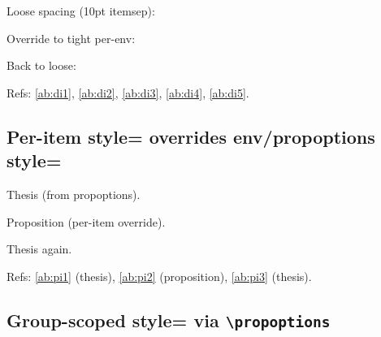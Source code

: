 \documentclass{article}
\begin{document}
Loose spacing (10pt itemsep):
\begin{prop}
  \item \label{ab:di1}
  \item \label{ab:di2}
\end{prop}

Override to tight per-env:
\begin{prop}[itemsep=2pt]
  \item \label{ab:di3}
  \item \label{ab:di4}
\end{prop}

Back to loose:
\begin{prop}
  \item \label{ab:di5}
\end{prop}


Refs: \ref{ab:di1}, \ref{ab:di2}, \ref{ab:di3}, \ref{ab:di4}, \ref{ab:di5}.

\subsection{Per-item style= overrides env/propoptions style=}



\begin{prop}
  \item[Claim G] Thesis (from propoptions). \label{ab:pi1}
  \item[style=proposition, Claim H] Proposition (per-item override). \label{ab:pi2}
  \item[Claim I] Thesis again. \label{ab:pi3}
\end{prop}


Refs: \ref{ab:pi1} (thesis), \ref{ab:pi2} (proposition), \ref{ab:pi3} (thesis).

\subsection{Group-scoped style= via \texttt{\textbackslash propoptions}}
\end{document}
